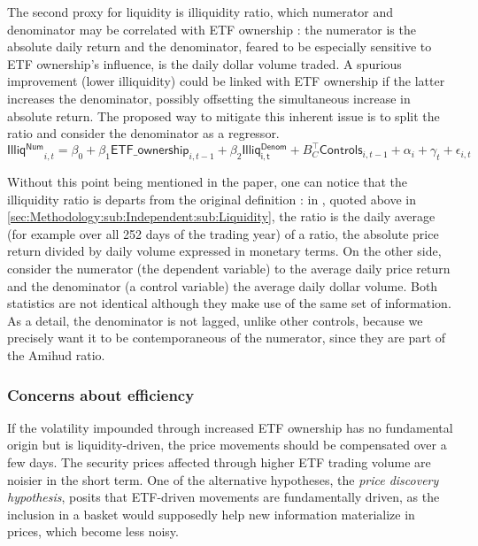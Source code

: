 The second proxy for liquidity is \textcite{Amihud2002} illiquidity ratio, which numerator and denominator may be correlated with ETF ownership : the numerator is the absolute daily return and the denominator, feared to be especially sensitive to ETF ownership's influence, is the daily dollar volume traded. A spurious improvement (lower illiquidity) could be linked with ETF ownership if the latter increases the denominator, possibly offsetting the simultaneous increase in absolute return. The proposed way to mitigate this inherent issue is to split the ratio and consider the denominator as a regressor.
 \begin{equation}
   \mathsf{Illiq^{Num}}_{i,t} = \beta_{0} + \beta_{1} \mathsf{ETF\_ownership}_{i, t - 1} + \beta_{2} \mathsf{Illiq^{Denom}_{i,t}} + B_{C}^{\intercal} \mathsf{Controls}_{i, t- 1} + \alpha_{i} + \gamma_{t} + \epsilon_{i, t}
\end{equation}

Without this point being mentioned in the paper, one can notice that the illiquidity ratio is departs from the original definition : in \textcite{Amihud2002}, quoted above in \autoref{sec:Methodology:sub:Independent:sub:Liquidity}, the ratio is the daily average (for example over all 252 days of the trading year) of a ratio, the absolute price return divided by daily volume expressed in monetary terms. On the other side, \textcite{Israeli2017} consider the numerator (the dependent variable) to the average daily price return and the denominator (a control variable) the average daily dollar volume. Both statistics are not identical although they make use of the same set of information. As a detail, the denominator is not lagged, unlike other controls, because we precisely want it to be contemporaneous of the numerator, since they are part of the Amihud ratio.

\subsubsection{Concerns about efficiency}
\label{subsec:Method:Efficiency}
If the volatility impounded through increased ETF ownership has no fundamental origin but is liquidity-driven, the price movements should be compensated over a few days. The security prices affected through higher ETF trading volume are noisier in the short term. One of the alternative hypotheses, the \emph{price discovery hypothesis}, posits that ETF-driven movements are fundamentally driven, as the inclusion in a basket would supposedly help new information materialize in prices, which become less noisy.

